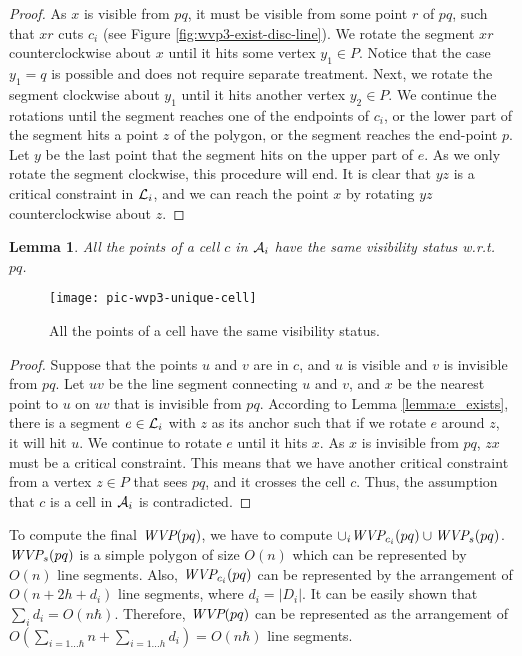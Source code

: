 \documentclass[5p]{elsarticle}
\newtheorem{lemma}[theorem]{Lemma}
\def\WVP{\mbox{\it{WVP}}}
\def\P{\mbox{${P}$}}
\begin{document}
\begin{proof}
As $x$ is visible from $pq$, 
it must be visible from some point $r$ of $pq$, such that $xr$ cuts $c_i$
(see Figure \ref{fig:wvp3-exist-disc-line}).
We rotate the segment $xr$ counterclockwise about $x$ until
it hits some vertex $y_1 \in \P$. 
Notice that the case $y_1 = q$ is possible and does not require separate
treatment.
Next, we rotate the segment clockwise about $y_1$ until it hits another vertex $y_2 \in \P$. 
We continue the rotations until the segment reaches one of the endpoints of $c_i$, 
or the lower part of the segment hits a point $z$ of the polygon,
or the segment reaches the end-point $p$. 
Let $y$ be the last point that the segment hits on the upper part of $e$. 
As we only rotate the segment clockwise, this
procedure will end.
It is clear that
$yz$ is a critical constraint in ${\cal L}_i$, and we can reach the point $x$ by rotating
$yz$ counterclockwise about $z$. 
\end{proof}




\begin{lemma}
All the points of a cell $c$ in ${\cal A}_i$ have the same
visibility status w.r.t.\ $pq$.
\end{lemma}

\begin{figure}[h]
  \centering
  \texttt{[image: pic-wvp3-unique-cell]} 
  \caption{All the points of a cell have the same visibility status.}
  \label{fig:wvp3-unique-cell}
\end{figure}


\begin{proof}
Suppose that the points $u$ and $v$ are in $c$, and $u$ is visible 
and $v$ is invisible from $pq$. Let $uv$ be the line segment connecting
$u$ and $v$, and $x$ be the nearest point to $u$ on $uv$ that is invisible from $pq$.
According to Lemma \ref{lemma:e_exists}, there is a segment $e \in {\cal L}_i$ with
$z$ as its anchor such that if we rotate $e$ around $z$, it will hit $u$. 
We continue to rotate $e$ until it hits $x$. As $x$ is invisible from $pq$,
$zx$ must be a critical constraint. This means that we have another critical constraint
from a vertex $z \in \P$ that sees $pq$, and it crosses the cell $c$. Thus,
the assumption that $c$ is a cell in ${\cal A}_i$ is contradicted.
\end{proof}



To compute the final $\WVP(pq)$, we have to compute 
$\cup_{i} \WVP_{c_i}(pq) \cup \WVP_s(pq)$. 
$\WVP_s(pq)$ is a simple polygon of size $O(n)$ which can be represented
by $O(n)$ line segments. Also, $\WVP_{c_i}(pq)$ can be represented
by the arrangement of $O(n + 2h + d_i)$ line segments,
where $d_i = |D_i|$. 
It can be easily shown that $\sum_i d_i = O(n\hbar)$. 
Therefore, $\WVP(pq)$ can be represented as the arrangement of 
$O(\sum_{i=1 \ldots \hbar} n +  \sum_{i=1 \ldots h} d_i) = O(n\hbar)$ line segments.
\end{document}
